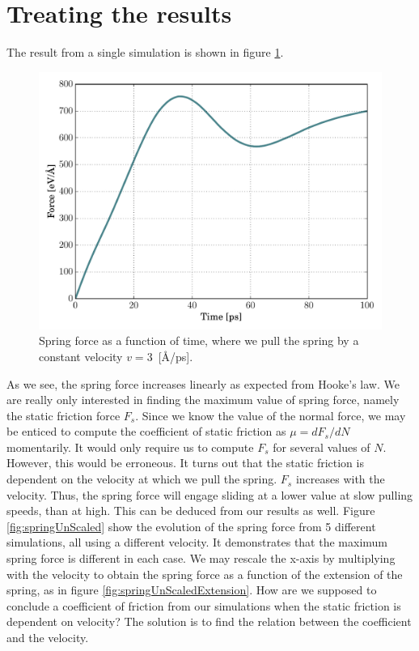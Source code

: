 \documentclass[twoside,english]{uiofysmaster}
\begin{document}
\section{Treating the results}
The result from a single simulation is shown in figure \ref{fig:springSingle_v3}.
\begin{figure}
	\centering
	\includegraphics[width=0.7\linewidth]{figures/friction/scalingCoeffisient/single_v3}
	\caption{Spring force as a function of time, where we pull the spring by a constant velocity $v=3$~[\AA/ps].}
	\label{fig:springSingle_v3}
\end{figure}
\noindent
As we see, the spring force increases linearly as expected from Hooke's law. 
We are really only interested in finding the maximum value of spring force, namely the static friction force $F_s$.
Since we know the value of the normal force, we may be enticed to compute the coefficient of static friction as $\mu=dF_ s/dN$ momentarily. 
It would only require us to compute $F_s$ for several values of $N$. 
However, this would be erroneous. 
It turns out that the static friction is dependent on the velocity at which we pull the spring. 
$F_s$ increases with the velocity.
Thus, the spring force will engage sliding at a lower value at slow pulling speeds, than at high.
This can be deduced from our results as well. 
Figure \ref{fig:springUnScaled} show the evolution of the spring force from 5 different simulations, all using a different velocity. 
It demonstrates that the maximum spring force is different in each case. 
We may rescale the x-axis by multiplying with the velocity to obtain the spring force as a function of the extension of the spring, as in figure \ref{fig:springUnScaledExtension}.
How are we supposed to conclude a coefficient of friction from our simulations when the static friction is dependent on velocity? 
The solution is to find the relation between the coefficient and the velocity.
\end{document}
